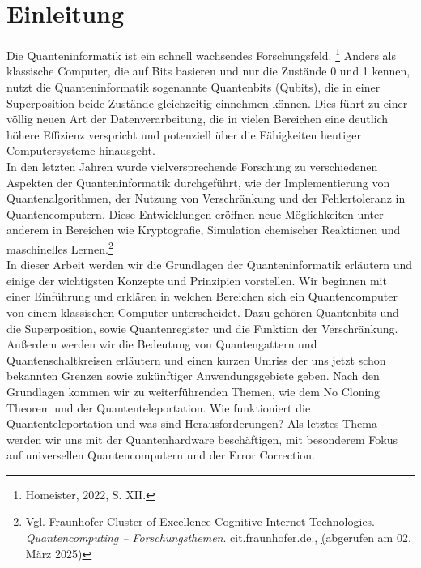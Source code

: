 \section{Einleitung}
\label{sec:einleitung}

Die Quanteninformatik ist ein schnell wachsendes Forschungsfeld. \footnote{Homeister, 2022, S. XII.}
Anders als klassische Computer, die auf Bits basieren und nur die Zustände 0 und 1 kennen, nutzt die Quanteninformatik sogenannte Quantenbits (Qubits), die in einer Superposition beide Zustände gleichzeitig einnehmen können.
Dies führt zu einer völlig neuen Art der Datenverarbeitung, die in vielen Bereichen eine deutlich höhere Effizienz verspricht und potenziell über die Fähigkeiten heutiger Computersysteme hinausgeht.\\

In den letzten Jahren wurde vielversprechende Forschung zu verschiedenen Aspekten der Quanteninformatik durchgeführt, wie der Implementierung von Quantenalgorithmen, der Nutzung von Verschränkung und der Fehlertoleranz in Quantencomputern.
Diese Entwicklungen eröffnen neue Möglichkeiten unter anderem in Bereichen wie Kryptografie, Simulation chemischer Reaktionen und maschinelles Lernen.\footnote{Vgl. Fraunhofer Cluster of Excellence Cognitive Internet Technologies. \textit{Quantencomputing – Forschungsthemen}. cit.fraunhofer.de., \href{https://www.cit.fraunhofer.de/de/Forschungsthemen/quantencomputing.html} (abgerufen am 02. März 2025)}\\

In dieser Arbeit werden wir die Grundlagen der Quanteninformatik erläutern und einige der wichtigsten Konzepte und Prinzipien vorstellen.
Wir beginnen mit einer Einführung und erklären in welchen Bereichen sich ein Quantencomputer von einem klassischen Computer unterscheidet.
Dazu gehören Quantenbits und die Superposition, sowie Quantenregister und die Funktion der Verschränkung.
Außerdem werden wir die Bedeutung von Quantengattern und Quantenschaltkreisen erläutern und einen kurzen Umriss der uns jetzt schon bekannten Grenzen sowie zukünftiger Anwendungsgebiete geben.
Nach den Grundlagen kommen wir zu weiterführenden Themen, wie dem No Cloning Theorem und der Quantenteleportation.
Wie funktioniert die Quantenteleportation und was sind Herausforderungen?
Als letztes Thema werden wir uns mit der Quantenhardware beschäftigen, mit besonderem Fokus auf universellen Quantencomputern und der Error Correction.

